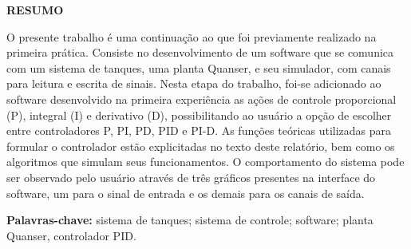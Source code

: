 \documentclass[a4paper,12pt]{article}
\begin{document}

\thispagestyle{empty}

\begin{center}
{\large \textbf{RESUMO}}
\end{center}

\vspace{3cm}

\begin{flushleft}

\hspace{4ex}O presente trabalho é uma continuação ao que foi previamente realizado na primeira prática. Consiste no desenvolvimento de um software que se comunica com um sistema de tanques, uma planta Quanser, e seu simulador, com canais para leitura e escrita de sinais. Nesta etapa do trabalho, foi-se adicionado ao software desenvolvido na primeira experiência as ações de controle proporcional (P), integral (I) e derivativo (D), possibilitando ao usuário a opção de escolher entre controladores P, PI, PD, PID e PI-D. As funções teóricas utilizadas para formular o controlador estão explicitadas no texto deste relatório, bem como os algoritmos que simulam seus funcionamentos. O comportamento do sistema pode ser observado pelo usuário através de três gráficos presentes na interface do software, um para o sinal de entrada e os demais para os canais de saída.\\

\end{flushleft}

\vspace{1.5cm}

\textbf{Palavras-chave:} sistema de tanques; sistema de controle; software; planta Quanser, controlador PID.

\newpage


\thispagestyle{empty}

\begin{center}
\listoffigures
\end{center}

\newpage


\thispagestyle{empty}

\begin{center}
\tableofcontents
\end{center}

\newpage
\end{document}
